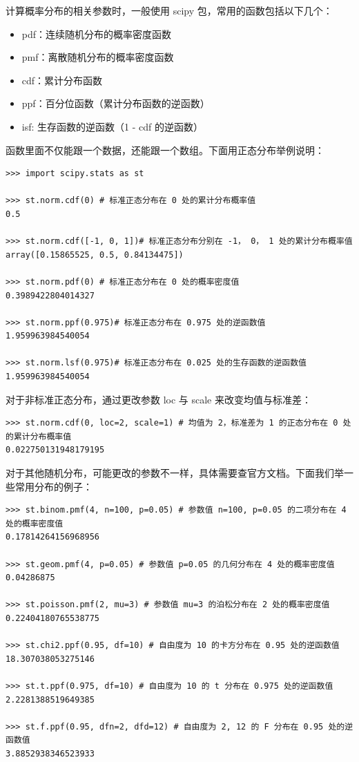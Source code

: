 计算概率分布的相关参数时，一般使用 scipy 包，常用的函数包括以下几个：

\begin{itemize}
  \item pdf：连续随机分布的概率密度函数
  \item pmf：离散随机分布的概率密度函数
  \item cdf：累计分布函数
  \item ppf：百分位函数（累计分布函数的逆函数）
  \item isf: 生存函数的逆函数（1 - cdf 的逆函数）
\end{itemize}

函数里面不仅能跟一个数据，还能跟一个数组。下面用正态分布举例说明：

\begin{lstlisting}[Language=Python]
>>> import scipy.stats as st

>>> st.norm.cdf(0) # 标准正态分布在 0 处的累计分布概率值
0.5

>>> st.norm.cdf([-1, 0, 1])# 标准正态分布分别在 -1， 0， 1 处的累计分布概率值
array([0.15865525, 0.5, 0.84134475])

>>> st.norm.pdf(0) # 标准正态分布在 0 处的概率密度值
0.3989422804014327

>>> st.norm.ppf(0.975)# 标准正态分布在 0.975 处的逆函数值
1.959963984540054

>>> st.norm.lsf(0.975)# 标准正态分布在 0.025 处的生存函数的逆函数值
1.959963984540054
\end{lstlisting}

对于非标准正态分布，通过更改参数 loc 与 scale 来改变均值与标准差：

\begin{lstlisting}[Language=Python]
>>> st.norm.cdf(0, loc=2, scale=1) # 均值为 2，标准差为 1 的正态分布在 0 处的累计分布概率值
0.022750131948179195
\end{lstlisting}

对于其他随机分布，可能更改的参数不一样，具体需要查官方文档。下面我们举一些常用分布的例子：

\begin{lstlisting}[Language=Python]
>>> st.binom.pmf(4, n=100, p=0.05) # 参数值 n=100, p=0.05 的二项分布在 4 处的概率密度值
0.17814264156968956

>>> st.geom.pmf(4, p=0.05) # 参数值 p=0.05 的几何分布在 4 处的概率密度值
0.04286875

>>> st.poisson.pmf(2, mu=3) # 参数值 mu=3 的泊松分布在 2 处的概率密度值
0.22404180765538775

>>> st.chi2.ppf(0.95, df=10) # 自由度为 10 的卡方分布在 0.95 处的逆函数值
18.307038053275146

>>> st.t.ppf(0.975, df=10) # 自由度为 10 的 t 分布在 0.975 处的逆函数值
2.2281388519649385

>>> st.f.ppf(0.95, dfn=2, dfd=12) # 自由度为 2, 12 的 F 分布在 0.95 处的逆函数值
3.8852938346523933
\end{lstlisting}



